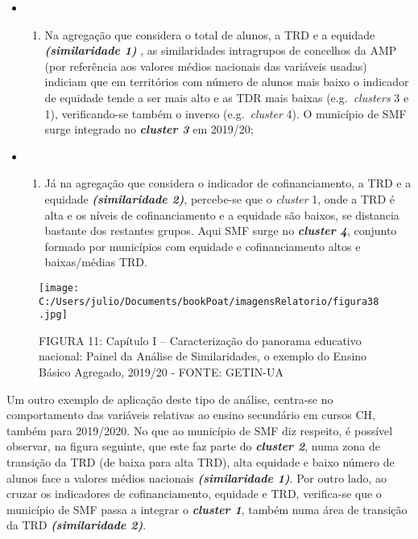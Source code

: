\documentclass[
]{book}
\providecommand{\tightlist}{%
  \setlength{\itemsep}{0pt}\setlength{\parskip}{0pt}}
\begin{document}
\begin{itemize}
\item
  \begin{enumerate}
  \def\labelenumi{\roman{enumi})}
  \tightlist
  \item
    Na agregação que considera o total de alunos, a TRD e a equidade \textbf{\emph{(similaridade 1)}} , as similaridades intragrupos de concelhos da AMP (por referência aos valores médios nacionais das variáveis usadas) indiciam que em territórios com número de alunos mais baixo o indicador de equidade tende a ser mais alto e as TDR mais baixas (e.g.~\emph{clusters} 3 e 1), verificando-se também o inverso (e.g.~\emph{cluster} 4). O município de SMF surge integrado no \textbf{\emph{cluster 3}} em 2019/20;
  \end{enumerate}
\item
  \begin{enumerate}
  \def\labelenumi{\roman{enumi})}
  \setcounter{enumi}{1}
  \tightlist
  \item
    Já na agregação que considera o indicador de cofinanciamento, a TRD e a equidade \textbf{\emph{(similaridade 2)}}, percebe-se que o \emph{cluster} 1, onde a TRD é alta e os níveis de cofinanciamento e a equidade são baixos, se distancia bastante dos restantes grupos. Aqui SMF surge no \textbf{\emph{cluster 4}}, conjunto formado por municípios com equidade e cofinanciamento altos e baixas/médias TRD.
  \end{enumerate}
\end{itemize}

\begin{figure}
\centering
\texttt{[image: C:/Users/julio/Documents/bookPoat/imagensRelatorio/figura38.jpg]}
\caption{FIGURA 11: Capítulo I -- Caracterização do panorama educativo nacional: Painel da Análise de Similaridades, o exemplo do Ensino Básico Agregado, 2019/20 - FONTE: GETIN-UA}
\end{figure}

Um outro exemplo de aplicação deste tipo de análise, centra-se no comportamento das variáveis relativas ao ensino secundário em cursos CH, também para 2019/2020. No que ao município de SMF diz respeito, é possível observar, na figura seguinte, que este faz parte do \textbf{\emph{cluster 2}}, numa zona de transição da TRD (de baixa para alta TRD), alta equidade e baixo número de alunos face a valores médios nacionais \textbf{\emph{(similaridade 1)}}. Por outro lado, ao cruzar os indicadores de cofinanciamento, equidade e TRD, verifica-se que o município de SMF passa a integrar o \textbf{\emph{cluster 1}}, também numa área de transição da TRD \textbf{\emph{(similaridade 2)}}.
\end{document}
